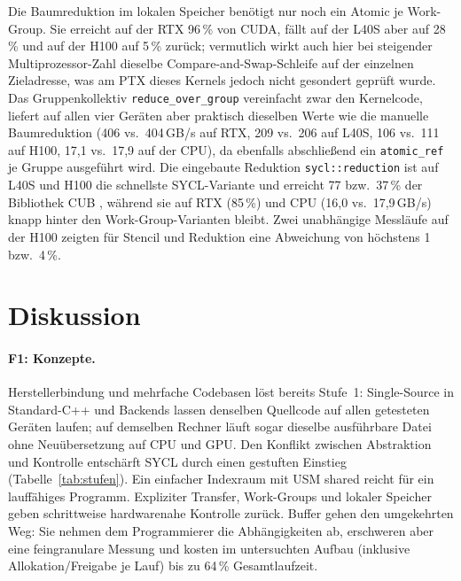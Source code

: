 \documentclass[12pt,a4paper]{article}
\begin{document}
Die Baumreduktion im lokalen Speicher benötigt nur noch ein Atomic je
Work-Group. Sie erreicht auf der RTX 96\,\% von CUDA, fällt auf der L40S aber
auf 28\,\% und auf der H100 auf 5\,\% zurück; vermutlich wirkt auch hier bei
steigender Multiprozessor-Zahl dieselbe Compare-and-Swap-Schleife auf der
einzelnen Zieladresse, was am PTX dieses Kernels jedoch nicht gesondert geprüft
wurde. Das Gruppenkollektiv \texttt{reduce\_\allowbreak over\_\allowbreak group} vereinfacht zwar den
Kernelcode, liefert auf allen vier Geräten aber praktisch dieselben Werte wie
die manuelle Baumreduktion (406 vs.\ 404\,GB/s auf RTX, 209 vs.\ 206 auf L40S,
106 vs.\ 111 auf H100, 17,1 vs.\ 17,9 auf der CPU), da ebenfalls abschließend ein
\texttt{atomic\_ref} je Gruppe ausgeführt wird. Die eingebaute Reduktion
\texttt{sycl::reduction} ist auf L40S und H100 die schnellste SYCL-Variante und
erreicht 77 bzw.\ 37\,\% der Bibliothek CUB \cite{nvidia_cub}, während sie auf
RTX (85\,\%) und CPU (16,0 vs.\ 17,9\,GB/s) knapp hinter den
Work-Group-Varianten bleibt. Zwei unabhängige Messläufe auf der H100 zeigten
für Stencil und Reduktion eine Abweichung von höchstens 1 bzw.\ 4\,\%.

\section{Diskussion}\label{sec:diskussion}

\paragraph{F1: Konzepte.}
Herstellerbindung und mehrfache Codebasen löst bereits Stufe~1: Single-Source
in Standard-C++ und Backends lassen denselben Quellcode auf allen getesteten
Geräten laufen; auf demselben Rechner läuft sogar dieselbe ausführbare Datei
ohne Neuübersetzung auf CPU und GPU\@. Den Konflikt zwischen Abstraktion und
Kontrolle entschärft SYCL durch einen gestuften Einstieg
(Tabelle~\ref{tab:stufen}). Ein einfacher Indexraum mit USM shared reicht für
ein lauffähiges Programm. Expliziter Transfer, Work-Groups und lokaler Speicher
geben schrittweise hardwarenahe Kontrolle zurück. Buffer gehen den umgekehrten
Weg: Sie nehmen dem Programmierer die Abhängigkeiten ab, erschweren aber eine
feingranulare Messung und kosten im untersuchten Aufbau (inklusive
Allokation/Freigabe je Lauf) bis zu 64\,\% Gesamtlaufzeit.
\end{document}
